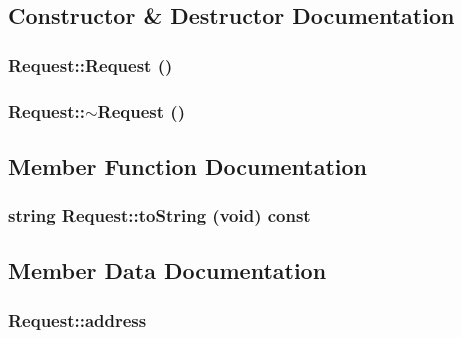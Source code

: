 \subsection{Constructor \& Destructor Documentation}
\hypertarget{classRequest_faf8d8928de7ffff8a3767589489bd33}{
\subsubsection[{Request}]{\setlength{\rightskip}{0pt plus 5cm}Request::Request ()}}
\label{classRequest_faf8d8928de7ffff8a3767589489bd33}


\hypertarget{classRequest_4d57c725686701f773eb3630630a7ea2}{
\subsubsection[{$\sim$Request}]{\setlength{\rightskip}{0pt plus 5cm}Request::$\sim$Request ()}}
\label{classRequest_4d57c725686701f773eb3630630a7ea2}




\subsection{Member Function Documentation}
\hypertarget{classRequest_ac0f47abb968f811192430e89e098027}{
\subsubsection[{toString}]{\setlength{\rightskip}{0pt plus 5cm}string Request::toString (void) const}}
\label{classRequest_ac0f47abb968f811192430e89e098027}




\subsection{Member Data Documentation}
\hypertarget{classRequest_0fd64e90be9318a9d1e81f7a70a6eefb}{
\subsubsection[{address}]{ {\bf Request::address}}}
\label{classRequest_0fd64e90be9318a9d1e81f7a70a6eefb}


